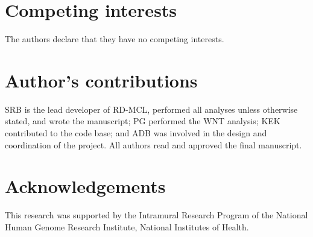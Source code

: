 \documentclass[twocolumn]{bmcart}  %
\begin{document}
\begin{backmatter}

\section*{Competing interests}
  The authors declare that they have no competing interests.


\section*{Author's contributions}
  SRB is the lead developer of RD-MCL, performed all analyses unless otherwise stated, and wrote the manuscript;
  PG performed the WNT analysis;
  KEK contributed to the code base;
  and ADB was involved in the design and coordination of the project.
  All authors read and approved the final manuscript.


\section*{Acknowledgements}
  This research was supported by the Intramural Research Program of the National Human Genome Research Institute, National Institutes of Health.





\end{backmatter}
\end{document}

